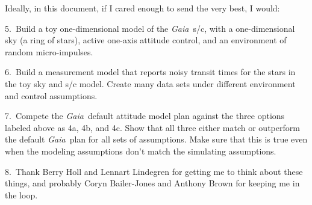 \documentclass[12pt]{article}
\newcommand{\project}[1]{\textsl{#1}}
\newcommand{\gaia}{\project{Gaia}}
\begin{document}
Ideally, in this document, if I cared enough to send the very best, I
would:

5.~Build a toy one-dimensional model of the \gaia\ s/c, with a
one-dimensional sky (a ring of stars), active one-axis attitude
control, and an environment of random micro-impulses.

6.~Build a measurement model that reports noisy transit times for the
stars in the toy sky and s/c model.  Create many data sets under
different environment and control assumptions.

7.~Compete the \gaia\ default attitude model plan against the three
options labeled above as 4a, 4b, and 4c.  Show that all three either
match or outperform the default \gaia\ plan for all sets of
assumptions.  Make sure that this is true even when the modeling
assumptions don't match the simulating assumptions.

8.~Thank Berry Holl and Lennart Lindegren for getting me to think
about these things, and probably Coryn Bailer-Jones and Anthony Brown
for keeping me in the loop.
\end{document}
